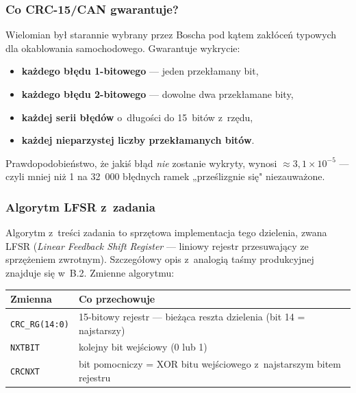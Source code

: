 \documentclass[12pt,a4paper]{article}
\begin{document}
\subsubsection*{Co CRC-15/CAN gwarantuje?}

Wielomian był starannie wybrany przez Boscha pod kątem zakłóceń typowych dla
okablowania samochodowego. Gwarantuje wykrycie:
\begin{itemize}
    \item \textbf{każdego błędu 1-bitowego} — jeden przekłamany bit,
    \item \textbf{każdego błędu 2-bitowego} — dowolne dwa przekłamane bity,
    \item \textbf{każdej serii błędów} o~długości do 15~bitów z~rzędu,
    \item \textbf{każdej nieparzystej liczby przekłamanych bitów}.
\end{itemize}
Prawdopodobieństwo, że jakiś błąd \emph{nie} zostanie wykryty, wynosi
$\approx 3{,}1 \times 10^{-5}$ — czyli mniej niż 1 na 32~000 błędnych ramek
„prześlizgnie się" niezauważone.

\subsubsection*{Algorytm LFSR z~zadania}

Algorytm z~treści zadania to sprzętowa implementacja tego dzielenia, zwana
LFSR (\textit{Linear Feedback Shift Register} — liniowy rejestr przesuwający
ze sprzężeniem zwrotnym). Szczegółowy opis z~analogią taśmy produkcyjnej
znajduje się w~B.2. Zmienne algorytmu:

\begin{center}
\begin{tabular}{ll}
\toprule
\textbf{Zmienna} & \textbf{Co przechowuje} \\
\midrule
\texttt{CRC\_RG(14:0)} & 15-bitowy rejestr — bieżąca reszta dzielenia (bit 14 = najstarszy) \\
\texttt{NXTBIT} & kolejny bit wejściowy (0 lub 1) \\
\texttt{CRCNXT} & bit pomocniczy = XOR bitu wejściowego z~najstarszym bitem rejestru \\
\bottomrule
\end{tabular}
\end{center}
\end{document}
